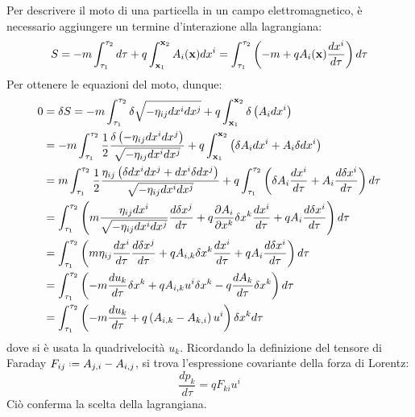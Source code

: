 Per descrivere il moto di una particella in un campo elettromagnetico, è necessario aggiungere un termine d'interazione alla lagrangiana:
\begin{equation}
	S = -m \int_{\tau_1}^{\tau_2} d\tau + q \int_{\mathbf{x}_1}^{\mathbf{x}_2} A_i(\mathbf{x}) dx^i = \int_{\tau_1}^{\tau_2} \left( -m + q A_i (\mathbf{x}) \frac{dx^i}{d\tau} \right) d\tau
	\label{eq:5.7}
\end{equation}
Per ottenere le equazioni del moto, dunque:
\begin{equation*}
	\begin{split}
		0
		&= \delta S = -m \int_{\tau_1}^{\tau_2} \delta\sqrt{-\eta_{ij} dx^i dx^j} + q \int_{\mathbf{x}_1}^{\mathbf{x}_2} \delta \left( A_i dx^i \right)\\
		&= -m \int_{\tau_1}^{\tau_2} \frac{1}{2} \frac{\delta \left( - \eta_{ij} dx^i dx^j \right)}{\sqrt{- \eta_{ij} dx^i dx^j}} + q \int_{\mathbf{x}_1}^{\mathbf{x}_2} \left( \delta A_i dx^i + A_i \delta dx^i \right)\\
		&= m \int_{\tau_1}^{\tau_2} \frac{1}{2} \frac{\eta_{ij} \left( \delta dx^i dx^j + dx^i \delta dx^j \right)}{\sqrt{- \eta_{ij} dx^i dx^j}} + q \int_{\tau_1}^{\tau_2} \left( \delta A_i \frac{dx^i}{d\tau} + A_i \frac{d\delta x^i}{d\tau} \right) d\tau\\
		&= \int_{\tau_1}^{\tau_2} \left( m \frac{\eta_{ij} dx^i}{\sqrt{- \eta_{ij} dx^i dx^j}} \frac{d\delta x^j}{d\tau} + q \frac{\partial A_i}{\partial x^k} \delta x^k \frac{dx^i}{d\tau} + q A_i \frac{d\delta x^i}{d\tau} \right) d\tau\\
		&= \int_{\tau_1}^{\tau_2} \left( m \eta_{ij} \frac{dx^i}{d\tau} \frac{d\delta x^j}{d\tau} + q A_{i,k} \delta x^k \frac{dx^i}{d\tau} + q A_i \frac{d\delta x^i}{d\tau} \right) d\tau\\
		&= \int_{\tau_1}^{\tau_2} \left( - m \frac{du_k}{d\tau} \delta x^k + q A_{i,k} u^i \delta x^k - q \frac{dA_k}{d\tau} \delta x^k \right) d\tau\\
		&= \int_{\tau_1}^{\tau_2} \left( -m \frac{du_k}{d\tau} + q \left( A_{i,k} - A_{k,i} \right) u^i \right) \delta x^k d\tau
	\end{split}
\end{equation*}
dove si è usata la quadrivelocità $ u_k $. Ricordando la definizione del tensore di Faraday $ F_{ij} \defeq A_{j,i} - A_{i,j} $, si trova l'espressione covariante della forza di Lorentz:
\begin{equation}
	\frac{dp_k}{d\tau} = q F_{ki} u^i
	\label{eq:5.8}
\end{equation}
Ciò conferma la scelta della lagrangiana.

